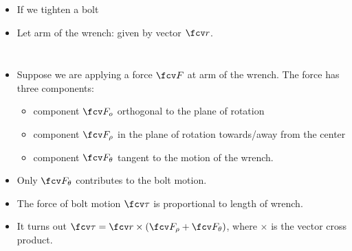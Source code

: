 \begin{frame}
\begin{columns}
\begin{itemize}
\item If we tighten a bolt  
\item<4-> Let arm of the wrench: given by vector $\fcv r$. 
\end{itemize}
\end{columns}
\begin{itemize}
\item<4-> Suppose we are applying a force $\fcv F$ at arm of the wrench. The force has three components: 
\begin{itemize}
\item<5-> component $\fcv F_o$ orthogonal to the plane of rotation
\item<6-> component $\fcv F_\rho$ in the plane of rotation towards/away from the center
\item<7-> component $\fcv F_\theta$ tangent to the motion of the wrench.
\end{itemize}
\item<8-> Only $\fcv F_\theta$ contributes to the bolt motion.
\item<9-> The force of bolt motion $\fcv \tau$ is proportional to length of wrench.
\item<10-> It turns out $\fcv \tau = \fcv r \times (\fcv F_\rho+\fcv F_\theta)$, where \alert<10>{$\times$ is the vector cross product}.
\end{itemize}
\end{frame}